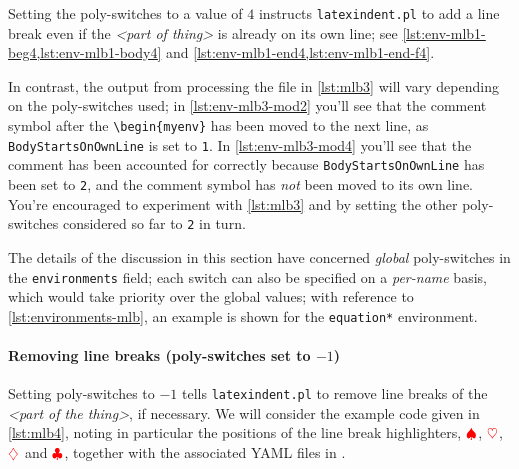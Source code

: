 		\begin{minipage}{.45\linewidth}
		\end{minipage}
		\hfill
		\begin{minipage}{.45\linewidth}
		\end{minipage}

		Setting the poly-switches to a value of $4$ instructs \texttt{latexindent.pl} to add a
		line break even if the \emph{<part of thing>} is already on its own line; see
		\cref{lst:env-mlb1-beg4,lst:env-mlb1-body4} and
		\cref{lst:env-mlb1-end4,lst:env-mlb1-end-f4}.

		In contrast, the output from processing the file in \cref{lst:mlb3} will vary depending
		on the poly-switches used; in \cref{lst:env-mlb3-mod2} you'll see that the comment symbol
		after the \lstinline!\begin{myenv}! has been moved to the next line, as
		\texttt{BodyStartsOnOwnLine} is set to \texttt{1}. In \cref{lst:env-mlb3-mod4} you'll see
		that the comment has been accounted for correctly because \texttt{BodyStartsOnOwnLine}
		has been set to \texttt{2}, and the comment symbol has \emph{not} been moved to its own
		line. You're encouraged to experiment with \cref{lst:mlb3} and by setting the other
		poly-switches considered so far to \texttt{2} in turn.

		\begin{cmhtcbraster}[raster column skip=.1\linewidth]
		\end{cmhtcbraster}

		The details of the discussion in this section have concerned \emph{global} poly-switches
		in the \texttt{environments} field; each switch can also be specified on a
		\emph{per-name} basis, which would take priority over the global values; with reference
		to \vref{lst:environments-mlb}, an example is shown for the \texttt{equation*}
		environment.

	\paragraph{Removing line breaks (poly-switches set to $-1$)}
		Setting poly-switches to $-1$ tells \texttt{latexindent.pl} to remove line breaks of the
		\emph{<part of the thing>}, if necessary. We will consider the example code given in
		\cref{lst:mlb4}, noting in particular the positions of the line break highlighters,
		$\color{red}\spadesuit$, $\color{red}\heartsuit$, $\color{red}\diamondsuit$ and
		$\color{red}\clubsuit$, together with the associated YAML files in
		.

